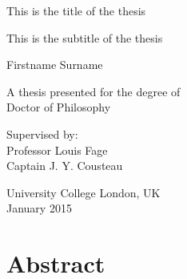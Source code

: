 \documentclass[12pt,a4paper,]{report}
\begin{document}
\begin{titlepage}
    \begin{center}


        \vspace*{2.5cm}

        \huge
        This is the title of the thesis

                \vspace{.5cm}

        \Large
        This is the subtitle of the thesis
        

        \vspace{1.5cm}

        \Large
        Firstname Surname

        \vspace{1.5cm}

        \normalsize
        A thesis presented for the degree of\\
        Doctor of Philosophy

        \vfill

        \normalsize
        Supervised by:\\
        Professor Louis Fage \\ Captain J. Y. Cousteau

        \vspace{0.8cm}


        \normalsize
        University College London, UK\\
        January 2015


    \end{center}
\end{titlepage}


\chapter*{Abstract}\label{abstract}
\end{document}
